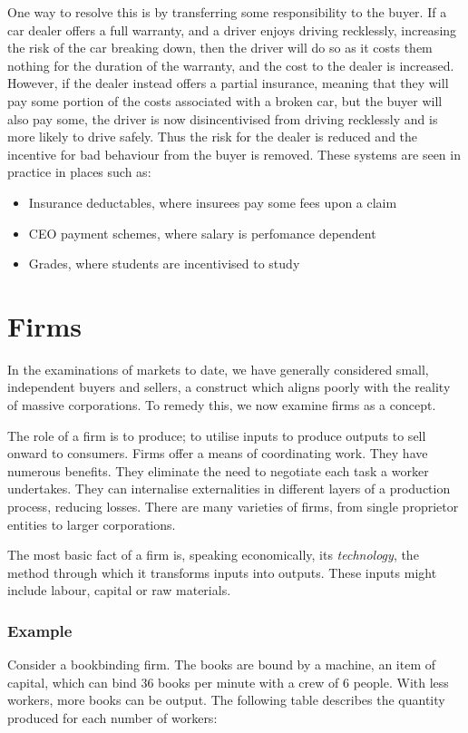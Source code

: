 \documentclass[12pt]{report}
\begin{document}
\begin{flushleft}
\bigskip
One way to resolve this is by transferring some responsibility to the buyer.
If a car dealer offers a full warranty, and a driver enjoys driving recklessly,
increasing the risk of the car breaking down, then the driver will do so as
it costs them nothing for the duration of the warranty, and the cost to the 
dealer is increased. However, if the dealer instead offers a partial insurance,
meaning that they will pay some portion of the costs associated with a broken
car, but the buyer will also pay some, the driver is now disincentivised from
driving recklessly and is more likely to drive safely. Thus the risk for the 
dealer is reduced and the incentive for bad behaviour from the buyer is 
removed. These systems are seen in practice in places such as:
\begin{itemize}
    \item Insurance deductables, where insurees pay some fees upon a claim
    \item CEO payment schemes, where salary is perfomance dependent
    \item Grades, where students are incentivised to study
\end{itemize}

\section*{Firms}
In the examinations of markets to date, we have generally considered small,
independent buyers and sellers, a construct which aligns poorly with the
reality of massive corporations. To remedy this, we now examine firms as a
concept.

\bigskip
The role of a firm is to produce; to utilise inputs to produce outputs to
sell onward to consumers. Firms offer a means of coordinating work. They have
numerous benefits. They eliminate the need to negotiate each task a worker
undertakes. They can internalise externalities in different layers of a 
production process, reducing losses. There are many varieties of firms, from
single proprietor entities to larger corporations.

\bigskip
The most basic fact of a firm is, speaking economically, its 
\textit{technology}, the method through which it transforms inputs into 
outputs. These inputs might include labour, capital or raw materials.

\subsubsection*{Example}
Consider a bookbinding firm. The books are bound by a machine, an item of 
capital, which can bind 36 books per minute with a crew of 6 people. With less
workers, more books can be output. The following table describes the quantity
produced for each number of workers:


\end{flushleft}
\end{document}
